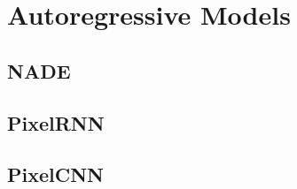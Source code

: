\section{Autoregressive Models} 

\subsection{NADE}

\subsection{PixelRNN} 


\subsection{PixelCNN}  


